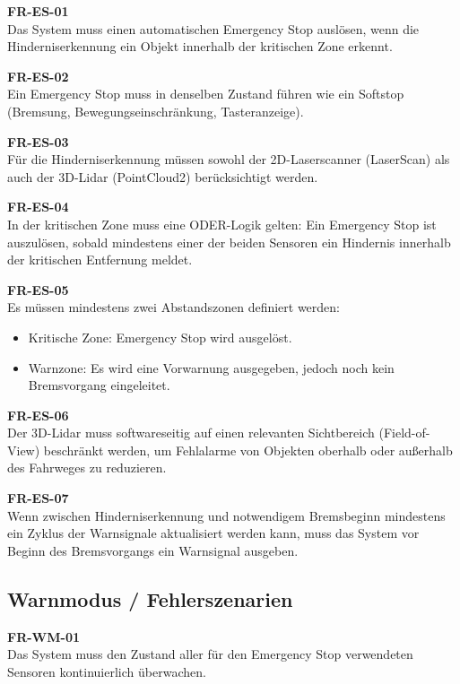 \textbf{FR-ES-01}\\
Das System muss einen automatischen Emergency Stop auslösen, wenn die Hinderniserkennung ein Objekt innerhalb der kritischen Zone erkennt.

\textbf{FR-ES-02}\\
Ein Emergency Stop muss in denselben Zustand führen wie ein Softstop (Bremsung, Bewegungseinschränkung, Tasteranzeige).

\textbf{FR-ES-03}\\
Für die Hinderniserkennung müssen sowohl der 2D-Laserscanner (LaserScan)
als auch der 3D-Lidar (PointCloud2) berücksichtigt werden.

\textbf{FR-ES-04}\\
In der kritischen Zone muss eine ODER-Logik gelten: Ein Emergency Stop ist auszulösen,
sobald mindestens einer der beiden Sensoren ein Hindernis innerhalb der kritischen Entfernung meldet.

\textbf{FR-ES-05}\\
Es müssen mindestens zwei Abstandszonen definiert werden:
\begin{itemize}
    \item Kritische Zone: Emergency Stop wird ausgelöst.
    \item Warnzone: Es wird eine Vorwarnung ausgegeben, jedoch noch kein Bremsvorgang eingeleitet.
\end{itemize}

\textbf{FR-ES-06}\\
Der 3D-Lidar muss softwareseitig auf einen relevanten Sichtbereich (Field-of-View) beschränkt werden, um Fehlalarme von Objekten oberhalb oder außerhalb des Fahrweges zu reduzieren.

\textbf{FR-ES-07}\\
Wenn zwischen Hinderniserkennung und notwendigem Bremsbeginn mindestens ein Zyklus der Warnsignale aktualisiert werden kann, muss das System vor Beginn des Bremsvorgangs ein Warnsignal ausgeben.


\subsection{Warnmodus / Fehlerszenarien}
\label{sec:warnmodus}

\textbf{FR-WM-01}\\
Das System muss den Zustand aller für den Emergency Stop verwendeten Sensoren kontinuierlich überwachen.


